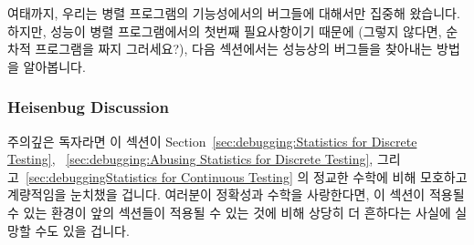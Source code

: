 여태까지, 우리는 병렬 프로그램의 기능성에서의 버그들에 대해서만 집중해
왔습니다.
하지만, 성능이 병렬 프로그램에서의 첫번째 필요사항이기 때문에 (그렇지 않다면,
순차적 프로그램을 짜지 그러세요?), 다음 섹션에서는 성능상의 버그들을 찾아내는
방법을 알아봅니다.

\subsubsection{Heisenbug Discussion}
\label{sec:debugging:Heisenbug Discussion}

주의깊은 독자라면 이 섹션이
Section~\ref{sec:debugging:Statistics for Discrete Testing},
~\ref{sec:debugging:Abusing Statistics for Discrete Testing},
그리고~\ref{sec:debuggingStatistics for Continuous Testing} 의 정교한 수학에
비해 모호하고 계량적임을 눈치챘을 겁니다.
여러분이 정확성과 수학을 사랑한다면, 이 섹션이 적용될 수 있는 환경이 앞의
섹션들이 적용될 수 있는 것에 비해 상당히 더 흔하다는 사실에 실망할 수도 있을
겁니다.

